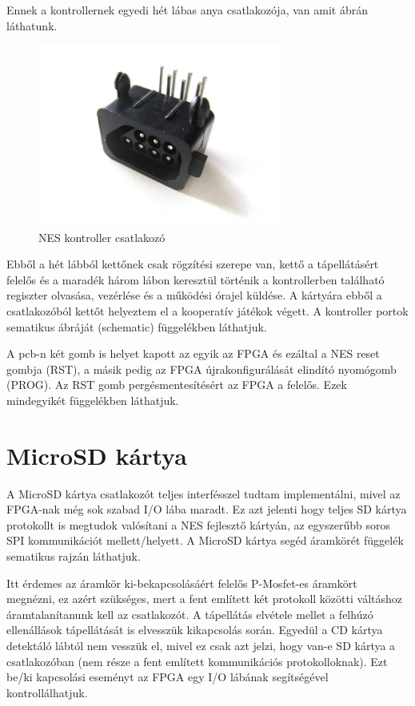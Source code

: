 	Ennek a kontrollernek egyedi hét lábas anya csatlakozója, van amit  ábrán láthatunk.   
	
	\begin{figure}[H]
		\centering
		\includegraphics[width=80mm, keepaspectratio]{figures/7pin-connector} %
		\caption{NES kontroller csatlakozó}
		\label{fig:7PIN-Port}
	\end{figure}
	
	Ebből a hét lábból kettőnek csak rögzítési szerepe van, kettő a tápellátásért felelős és a maradék három lábon keresztül történik a kontrollerben található regiszter olvasása, vezérlése és a működési órajel küldése. A kártyára ebből a csatlakozóból kettőt helyeztem el a kooperatív játékok végett. A kontroller portok sematikus ábráját (schematic)  függelékben láthatjuk.
	
	A pcb-n két gomb is helyet kapott az egyik az FPGA és ezáltal a NES reset gombja (RST), a másik pedig az FPGA újrakonfigurálását elindító nyomógomb (PROG). Az RST gomb pergésmentesítésért az FPGA a felelős. Ezek mindegyikét  függelékben láthatjuk. 
	
\section{MicroSD kártya}
	
	A MicroSD kártya csatlakozót teljes interfésszel tudtam implementálni, mivel az FPGA-nak még sok szabad I/O lába maradt. Ez azt jelenti hogy teljes SD kártya protokollt is megtudok valósítani a NES fejlesztő kártyán, az egyszerűbb soros SPI kommunikációt mellett/helyett. A MicroSD kártya segéd áramkörét  függelék sematikus rajzán láthatjuk. 
	
	Itt érdemes az áramkör ki-bekapcsolásáért felelős P-Mosfet-es áramkört megnézni, ez azért szükséges, mert a fent említett két protokoll közötti váltáshoz áramtalanítanunk kell az csatlakozót. A tápellátás elvétele mellet a felhúzó ellenállások tápellátását is elvesszük kikapcsolás során. Egyedül a CD kártya detektáló lábtól nem vesszük el, mivel ez csak azt jelzi, hogy van-e SD kártya a csatlakozóban (nem része a fent említett kommunikációs protokolloknak). Ezt be/ki kapcsolási eseményt az FPGA egy I/O lábának segítségével kontrollálhatjuk.
	
